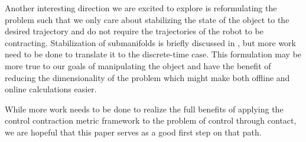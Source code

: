 \documentclass[journal]{IEEEtran}
\begin{document}
Another interesting direction we are excited to explore is reformulating the problem such that we only care about stabilizing the state of the object to the desired trajectory and do not require the trajectories of the robot to be contracting. Stabilization of submanifolds is briefly discussed in \autocite{manchesterControlContractionMetrics2017}, but more work need to be done to translate it to the discrete-time case. This formulation may be more true to our goals of manipulating the object and have the benefit of reducing the dimensionality of the problem which might make both offline and online calculations easier.

While more work needs to be done to realize the full benefits of applying the control contraction metric framework to the problem of control through contact, we are hopeful that this paper serves as a good first step on that path.

\printbibliography
\end{document}
